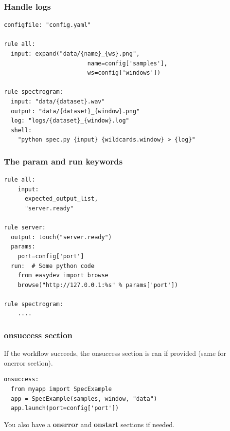 \documentclass{beamer}
\begin{document}


\begin{frame}[fragile]
 \frametitle{Handle logs}    
    \begin{block}{}
    \begin{lstlisting}[basicstyle=\small]
configfile: "config.yaml"

rule all:
  input: expand("data/{name}_{ws}.png", 
                        name=config['samples'], 
                        ws=config['windows'])

rule spectrogram:
  input: "data/{dataset}.wav"
  output: "data/{dataset}_{window}.png"
  log: "logs/{dataset}_{window}.log"
  shell: 
    "python spec.py {input} {wildcards.window} > {log}"  
    \end{lstlisting}
    \end{block} 
\end{frame}


\begin{frame}[fragile]
 \frametitle{The \textbf{param} and \textbf{run} keywords}
   \begin{block}{}
    \begin{lstlisting}[basicstyle=\small]
rule all:
    input: 
      expected_output_list,
      "server.ready"

rule server:
  output: touch("server.ready")
  params: 
    port=config['port']
  run:  # Some python code
    from easydev import browse
    browse("http://127.0.0.1:%s" % params['port'])

rule spectrogram:
    ....
    \end{lstlisting}
    \end{block} 
\end{frame}


\begin{frame}[fragile]
    \frametitle{onsuccess section}    
    If the workflow succeeds, the onsuccess section is ran if provided
    (same for onerror section).

    \begin{block}{}
    \begin{lstlisting}[basicstyle=\large]
onsuccess:
  from myapp import SpecExample
  app = SpecExample(samples, window, "data")
  app.launch(port=config['port'])
    \end{lstlisting}
    \end{block}
    
    You also have a \textbf{onerror} and \textbf{onstart} sections if needed.
\end{frame}
\end{document}
